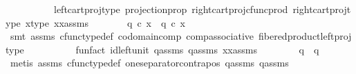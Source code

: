 \begin{isabellebody}
\ \ \ \ \ \ \ \ \ \ left{\isacharunderscore}{\kern0pt}cart{\isacharunderscore}{\kern0pt}proj{\isacharunderscore}{\kern0pt}type\ projection{\isacharunderscore}{\kern0pt}prop\ right{\isacharunderscore}{\kern0pt}cart{\isacharunderscore}{\kern0pt}proj{\isacharunderscore}{\kern0pt}cfunc{\isacharunderscore}{\kern0pt}prod\ right{\isacharunderscore}{\kern0pt}cart{\isacharunderscore}{\kern0pt}proj{\isacharunderscore}{\kern0pt}type\ x{\isacharunderscore}{\kern0pt}type\ xx{\isacharunderscore}{\kern0pt}assms{\isacharparenleft}{\kern0pt}{}{\isacharparenright}{\kern0pt}{\isacharparenright}{\kern0pt}\isanewline
\ \ \ \ \isamarkupfalse%
\ \isamarkupfalse%
\ {\isachardoublequoteopen}q{}\ {\isasymcirc}\isactrlsub c\ x\ {\isacharequal}{\kern0pt}\ q{}\ {\isasymcirc}\isactrlsub c\ x{\isachardoublequoteclose}\ \ \ \ \ \ \isanewline
\ \ \ \ \ \ \isamarkupfalse%
\ {\isacharparenleft}{\kern0pt}smt\ assms{\isacharparenleft}{\kern0pt}{}{\isacharparenright}{\kern0pt}\ cfunc{\isacharunderscore}{\kern0pt}type{\isacharunderscore}{\kern0pt}def\ codomain{\isacharunderscore}{\kern0pt}comp\ comp{\isacharunderscore}{\kern0pt}associative\ fibered{\isacharunderscore}{\kern0pt}product{\isacharunderscore}{\kern0pt}left{\isacharunderscore}{\kern0pt}proj{\isacharunderscore}{\kern0pt}type\isanewline
\ \ \ \ \ \ \ \ \ \ fun{\isacharunderscore}{\kern0pt}fact\ id{\isacharunderscore}{\kern0pt}left{\isacharunderscore}{\kern0pt}unit{}\ q{}{\isacharunderscore}{\kern0pt}assms\ q{}{\isacharunderscore}{\kern0pt}assms\ xx{\isacharunderscore}{\kern0pt}assms{\isacharparenright}{\kern0pt}\isanewline
\ \ \isamarkupfalse%
\isanewline
\ \ \isamarkupfalse%
\ \isamarkupfalse%
\ {\isachardoublequoteopen}q{}\ {\isacharequal}{\kern0pt}\ q{}{\isachardoublequoteclose}\isanewline
\ \ \ \ \isamarkupfalse%
\ {\isacharparenleft}{\kern0pt}metis\ assms{\isacharparenleft}{\kern0pt}{}{\isacharparenright}{\kern0pt}\ cfunc{\isacharunderscore}{\kern0pt}type{\isacharunderscore}{\kern0pt}def\ one{\isacharunderscore}{\kern0pt}separator{\isacharunderscore}{\kern0pt}contrapos\ q{}{\isacharunderscore}{\kern0pt}assms{\isacharparenleft}{\kern0pt}{}{\isacharparenright}{\kern0pt}\ q{}{\isacharunderscore}{\kern0pt}assms{\isacharparenleft}{\kern0pt}{}{\isacharparenright}{\kern0pt}{\isacharparenright}{\kern0pt}\isanewline
\ \ \isamarkupfalse%
\ \isamarkupfalse%

\end{isabellebody}
